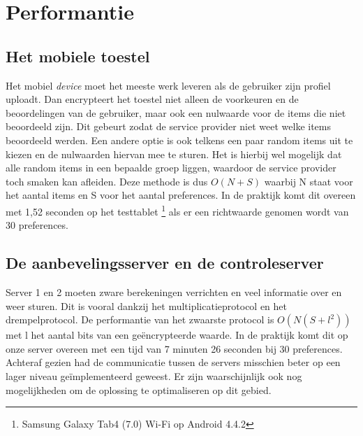 \section{Performantie}
\subsection{Het mobiele toestel}
Het mobiel \emph{device} moet het meeste werk leveren als de gebruiker zijn profiel uploadt. Dan encrypteert het toestel niet alleen de voorkeuren en de beoordelingen van de gebruiker, maar ook een nulwaarde voor de items die niet beoordeeld zijn. Dit gebeurt zodat de service provider niet weet welke items beoordeeld werden. Een andere optie is ook telkens een paar random items uit te kiezen en de nulwaarden hiervan mee te sturen. Het is hierbij wel mogelijk dat alle random items in een bepaalde groep liggen, waardoor de service provider toch smaken kan afleiden. Deze methode is dus $O(N+S)$ waarbij N staat voor het aantal items en S voor het aantal preferences.
In de praktijk komt dit overeen met 1,52 seconden op het testtablet \footnote{Samsung Galaxy Tab4 (7.0) Wi-Fi op Android 4.4.2} als er een richtwaarde genomen wordt van 30 preferences. 

\subsection{De aanbevelingsserver en de controleserver}
Server 1 en 2 moeten zware berekeningen verrichten en veel informatie over en weer sturen. Dit is vooral dankzij het multiplicatieprotocol en het drempelprotocol.  De performantie van het zwaarste protocol is $O(N(S+l^2))$ met l het aantal bits van een ge\"encrypteerde waarde. In de praktijk komt dit op onze server overeen met een tijd van 7 minuten 26 seconden bij 30 preferences. Achteraf gezien had de communicatie tussen de servers misschien beter op een lager niveau ge\"implementeerd geweest. Er zijn waarschijnlijk ook nog mogelijkheden om de oplossing te optimaliseren op dit gebied.